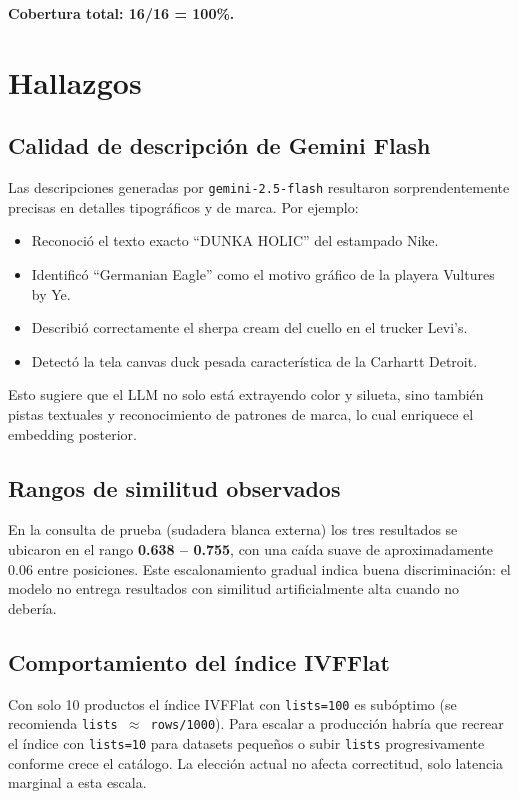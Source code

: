 \documentclass[11pt,letterpaper]{article}
\begin{document}
\textbf{Cobertura total: 16/16 = 100\%.}

\section{Hallazgos}

\subsection{Calidad de descripción de Gemini Flash}

Las descripciones generadas por \texttt{gemini-2.5-flash} resultaron sorprendentemente precisas en detalles tipográficos y de marca. Por ejemplo:

\begin{itemize}[leftmargin=*]
  \item Reconoció el texto exacto ``DUNKA HOLIC'' del estampado Nike.
  \item Identificó ``Germanian Eagle'' como el motivo gráfico de la playera Vultures by Ye.
  \item Describió correctamente el sherpa cream del cuello en el trucker Levi's.
  \item Detectó la tela canvas duck pesada característica de la Carhartt Detroit.
\end{itemize}

Esto sugiere que el LLM no solo está extrayendo color y silueta, sino también pistas textuales y reconocimiento de patrones de marca, lo cual enriquece el embedding posterior.

\subsection{Rangos de similitud observados}

En la consulta de prueba (sudadera blanca externa) los tres resultados se ubicaron en el rango \textbf{0.638 -- 0.755}, con una caída suave de aproximadamente 0.06 entre posiciones. Este escalonamiento gradual indica buena discriminación: el modelo no entrega resultados con similitud artificialmente alta cuando no debería.

\subsection{Comportamiento del índice IVFFlat}

Con solo 10 productos el índice IVFFlat con \texttt{lists=100} es subóptimo (se recomienda \texttt{lists $\approx$ rows/1000}). Para escalar a producción habría que recrear el índice con \texttt{lists=10} para datasets pequeños o subir \texttt{lists} progresivamente conforme crece el catálogo. La elección actual no afecta correctitud, solo latencia marginal a esta escala.
\end{document}
